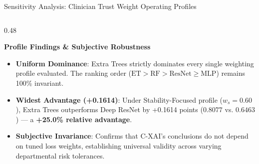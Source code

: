 \documentclass[aspectratio=169,10pt]{beamer}
\begin{document}
\begin{frame}{Sensitivity Analysis: Clinician Trust Weight Operating Profiles}
\begin{columns}[t]
\begin{column}{0.48\textwidth}
      \begin{exampleblock}{\textbf{Profile Findings \& Subjective Robustness}}
        \scriptsize
        \begin{itemize}\setlength\itemsep{3pt}
          \item \textbf{Uniform Dominance}:
          Extra Trees strictly dominates every single weighting profile evaluated. The ranking order ($\text{ET} > \text{RF} > \text{ResNet} \ge \text{MLP}$) remains 100\% invariant.
          \item \textbf{Widest Advantage (+0.1614)}:
          Under Stability-Focused profile ($w_s = 0.60$), Extra Trees outperforms Deep ResNet by +0.1614 points ($0.8077$ vs. $0.6463$) --- a \textbf{+25.0\% relative advantage}.
          \item \textbf{Subjective Invariance}:
          Confirms that C-XAI's conclusions do not depend on tuned loss weights, establishing universal validity across varying departmental risk tolerances.
        \end{itemize}
      \end{exampleblock}
    \end{column}
  \end{columns}
\end{frame}
\end{document}
